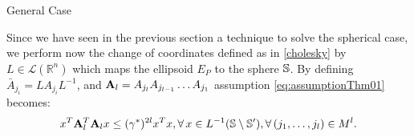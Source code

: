 \begin{subsection}{General Case}
\begin{pf}



Since we have seen in the previous section a technique to solve the spherical case, we perform now the change of coordinates defined as in \eqref{cholesky} by $L \in \mathcal{L}(\mathbb{R}^n)$ which maps the ellipsoid $E_P$ to the sphere $\mathbb{S}$. By defining \mbox{$\bar{A}_{j_i}=  L A_{j_i} L^{-1}$,} and $\mathbf{\relax{A}}_l = \relax{A}_{j_l} \relax{A}_{j_{l-1}} \dots \relax{A}_{j_1} $ assumption \eqref{eq:assumptionThm01} becomes:
\begin{equation}\label{eq:assumption3}
x^T \mathbf{\relax{A}}_l^T \mathbf{\relax{A}}_l x \leq ({\gamma^*})^{2l} x^T x, \forall\, x \in  L^{-1}(\mathbb{S} \setminus \mathbb{S}'), \forall\, (j_1,\dots,j_l) \in M^l.
\end{equation}


\end{pf}
\end{subsection}
